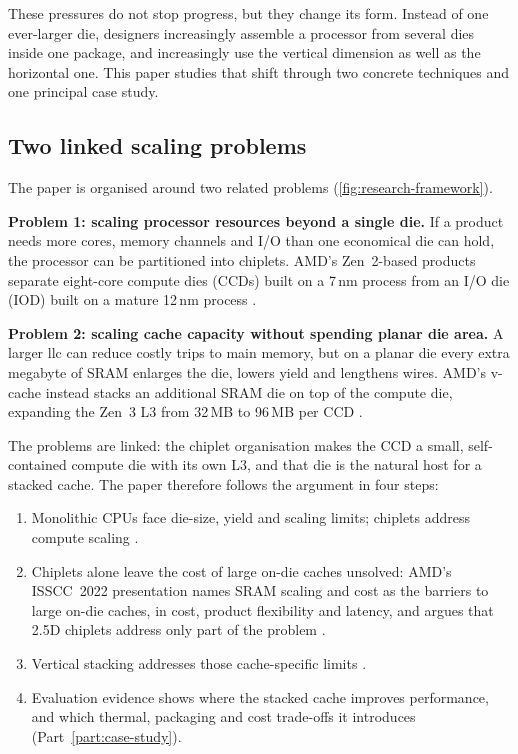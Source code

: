 These pressures do not stop progress, but they change its form. Instead of one ever-larger die, designers increasingly assemble a processor from several dies inside one package, and increasingly use the vertical dimension as well as the horizontal one. This paper studies that shift through two concrete techniques and one principal case study.

\subsection{Two linked scaling problems}
\label{sec:two-problems}

The paper is organised around two related problems (\cref{fig:research-framework}).

\textbf{Problem 1: scaling processor resources beyond a single die.} If a product needs more cores, memory channels and I/O than one economical die can hold, the processor can be partitioned into \glspl{chiplet}. AMD's Zen~2-based products separate eight-core compute dies (CCDs) built on a 7\,nm process from an I/O die (IOD) built on a mature 12\,nm process \cite{naffziger2020chiplet,suggs2019zen2}.

\textbf{Problem 2: scaling cache capacity without spending planar die area.} A larger \gls{llc} can reduce costly trips to main memory, but on a planar die every extra megabyte of SRAM enlarges the die, lowers yield and lengthens wires. AMD's \gls{v-cache} instead stacks an additional SRAM die on top of the compute die, expanding the Zen~3 L3 from 32\,MB to 96\,MB per CCD \cite{wuu2022vcache,amd2022epyc7003}.

The problems are linked: the chiplet organisation makes the CCD a small, self-contained compute die with its own L3, and that die is the natural host for a stacked cache. The paper therefore follows the argument in four steps:

\begin{enumerate}
  \item Monolithic CPUs face die-size, yield and scaling limits; chiplets address compute scaling \cite{naffziger2020chiplet}.
  \item Chiplets alone leave the cost of large on-die caches unsolved: AMD's ISSCC~2022 presentation names SRAM scaling and cost as the barriers to large on-die caches, in cost, product flexibility and latency, and argues that 2.5D chiplets address only part of the problem \cite[slides~6--7]{wuu2022vcache}.
  \item Vertical stacking addresses those cache-specific limits \cite{wuu2022vcache,swaminathanAdvancedPackagingEnabling2021}.
  \item Evaluation evidence shows where the stacked cache improves performance, and which thermal, packaging and cost trade-offs it introduces (Part~\ref{part:case-study}).
\end{enumerate}

